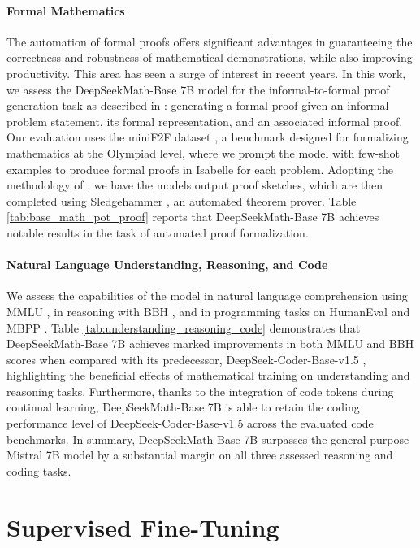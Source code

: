 \begin{itemize}[topsep=0pt]
\paragraph{Formal Mathematics}

The automation of formal proofs offers significant advantages in guaranteeing the correctness and robustness of mathematical demonstrations, while also improving productivity. This area has seen a surge of interest in recent years. In this work, we assess the DeepSeekMath-Base 7B model for the informal-to-formal proof generation task as described in \citep{dsp_proof}: generating a formal proof given an informal problem statement, its formal representation, and an associated informal proof. Our evaluation uses the miniF2F dataset \citep{minif2f}, a benchmark designed for formalizing mathematics at the Olympiad level, where we prompt the model with few-shot examples to produce formal proofs in Isabelle for each problem. Adopting the methodology of \cite{dsp_proof}, we have the models output proof sketches, which are then completed using Sledgehammer \citep{sledgehammer}, an automated theorem prover. Table \ref{tab:base_math_pot_proof} reports that DeepSeekMath-Base 7B achieves notable results in the task of automated proof formalization.

\paragraph{Natural Language Understanding, Reasoning, and Code}

We assess the capabilities of the model in natural language comprehension using MMLU \citep{mmlu}, in reasoning with BBH \citep{bbh}, and in programming tasks on HumanEval \citep{codex} and MBPP \citep{mbpp}. Table \ref{tab:understanding_reasoning_code} demonstrates that DeepSeekMath-Base 7B achieves marked improvements in both MMLU and BBH scores when compared with its predecessor, DeepSeek-Coder-Base-v1.5 \citep{deepseek-coder}, highlighting the beneficial effects of mathematical training on understanding and reasoning tasks. Furthermore, thanks to the integration of code tokens during continual learning, DeepSeekMath-Base 7B is able to retain the coding performance level of DeepSeek-Coder-Base-v1.5 across the evaluated code benchmarks. In summary, DeepSeekMath-Base 7B surpasses the general-purpose Mistral 7B model \citep{mistral} by a substantial margin on all three assessed reasoning and coding tasks.

\section{Supervised Fine-Tuning}


\end{itemize}
